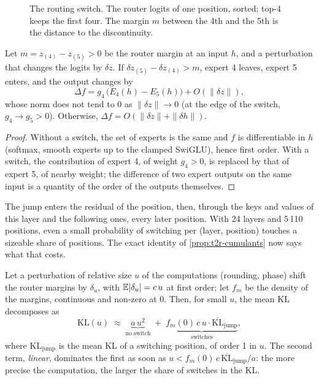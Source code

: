 \begin{figure}[ht]
\centering
\SchemaRefBascule
\caption[The routing switch]{The routing switch. The router logits of one position, sorted; top-4 keeps the first four. The margin $m$ between the 4th and the 5th is the distance to the discontinuity.}
\label{fig:t2r-bascule}
\end{figure}

\begin{proposition}\label{prop:t2r-saut}
Let $m = z_{(4)} - z_{(5)} > 0$ be the router margin at an input $h$, and a perturbation that changes the logits by $\delta z$. If $\delta z_{(5)} - \delta z_{(4)} > m$, expert 4 leaves, expert 5 enters, and the output changes by
\[
\Delta f = g_4\,\big(E_4(h) - E_5(h)\big) + O(\|\delta z\|),
\]
whose norm does not tend to 0 as $\|\delta z\| \to 0$ (at the edge of the switch, $g_4 \to g_5 > 0$). Otherwise, $\Delta f = O(\|\delta z\| + \|\delta h\|)$.
\end{proposition}

\begin{proof}
Without a switch, the set of experts is the same and $f$ is differentiable in $h$ (softmax, smooth experts up to the clamped SwiGLU), hence first order. With a switch, the contribution of expert 4, of weight $g_4 > 0$, is replaced by that of expert 5, of nearby weight; the difference of two expert outputs on the same input is a quantity of the order of the outputs themselves.
\end{proof}

The jump enters the residual of the position, then, through the keys and values of this layer and the following ones, every later position. With 24 layers and 5\,110 positions, even a small probability of switching per (layer, position) touches a sizeable share of positions. The exact identity of \cref{prop:t2r-cumulants} now says what that costs.

\begin{theoreme}\label{thm:t2r-amplification}
Let a perturbation of relative size $u$ of the computations (rounding, phase) shift the router margins by $\delta_u$, with $\mathbb{E}|\delta_u| = c\,u$ at first order; let $f_m$ be the density of the margins, continuous and non-zero at 0. Then, for small $u$, the mean KL decomposes as
\begin{equation}\label{eq:t2r-deux-regimes}
\overline{\mathrm{KL}}(u) \;\approx\; \underbrace{a\,u^2}_{\text{no switch}} \;+\; \underbrace{f_m(0)\, c\, u \cdot \overline{\mathrm{KL}}_{\text{jump}}}_{\text{switches}},
\end{equation}
where $\overline{\mathrm{KL}}_{\text{jump}}$ is the mean KL of a switching position, of order 1 in $u$. The second term, \emph{linear}, dominates the first as soon as $u < f_m(0)\,c\,\overline{\mathrm{KL}}_{\text{jump}}/a$: the more precise the computation, the larger the share of switches in the KL.
\end{theoreme}

